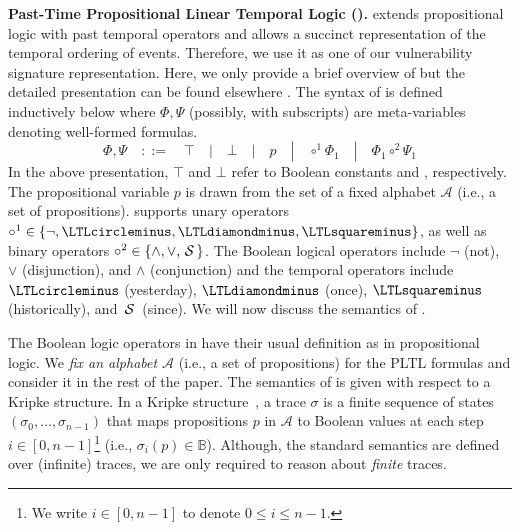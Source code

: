 \textbf{Past-Time Propositional Linear Temporal Logic (\pltl).}
\label{sec:pltl_syntax_and_semantics}
%
\pltl extends propositional logic with past temporal operators
and allows a succinct representation of the temporal ordering
of events.
%
Therefore, we use it as one of our vulnerability signature representation.
%
Here, we only provide a brief overview of \pltl but the detailed presentation can be found elsewhere \cite{pastpltl1985}.
The syntax of \pltl is defined inductively below where $\Phi, \Psi$ (possibly, with subscripts) are meta-variables
denoting well-formed \pltl formulas.
\begin{equation*}
  \Phi,\Psi  \quad::=\quad \top\quad|\quad \bot\quad|\quad p \quad|\quad  \circ^{1} \Phi_1 \quad|\quad \Phi_1 \circ^{2} \Psi_1
\end{equation*}
%
In the above presentation, $\top$ and $\bot$ refer to Boolean constants \true\; and \false, respectively.
The propositional variable $p$ is drawn from the set of a fixed alphabet
$\mathcal{A}$ (i.e., a set of propositions). \pltl supports unary operators
$\circ^{1}\in\{\neg, \yesterday, \once, \historically\}$,
 as well as binary operators  $\circ^{2}\in\{\wedge,\vee, \,\mathrm{\cal S}\,\}$.
The Boolean logical operators include $\neg$ (not), $\vee$ (disjunction), and
$\wedge$ (conjunction) and the temporal operators include
$\yesterday$ (yesterday), $\once$ (once), $\historically$ (historically), and $\,\mathrm{\cal S}\,$ (since).
We will now discuss the semantics of \pltl.

The Boolean logic operators in \pltl have their usual definition as in propositional logic.
We \emph{fix an alphabet $\mathcal{A}$} (i.e., a set of propositions)
for the PLTL formulas and consider it in the rest of the paper.
The semantics of \pltl is given with respect to a Kripke structure.
In a Kripke structure~\cite{Kri63}, a trace $\sigma$ is a finite sequence of states $(\sigma_0, \dots, \sigma_{n-1})$
that maps  propositions $p$ in $\mathcal{A}$ to  Boolean values
at each step $i\in[0,n-1]$\footnote{We write $i\in[0,n-1]$ to denote $0\leq i\leq n-1$.}
(i.e., $\sigma_i(p)\in\mathbb{B}$).
Although, the standard \pltl semantics are defined over (infinite) traces,
we are only required to reason about \emph{finite} traces.

